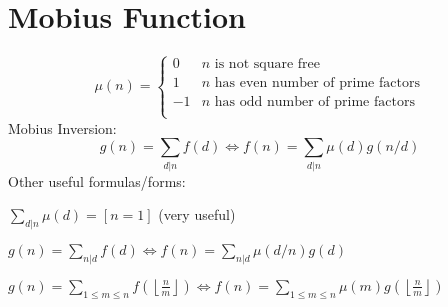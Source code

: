 \section{Mobius Function}
\[
   \mu(n) = \begin{cases} 0 & n \textrm{ is not square free}\\ 1 & n \textrm{ has even number of prime factors}\\ -1 & n \textrm{ has odd number of prime factors}\\\end{cases}
\]
Mobius Inversion:
\[ g(n) = \sum_{d|n} f(d) \Leftrightarrow f(n) = \sum_{d|n} \mu(d)g(n/d) \]
Other useful formulas/forms:

$ \sum_{d | n} \mu(d) = [ n = 1] $ (very useful)

$ g(n) = \sum_{n|d} f(d) \Leftrightarrow f(n) = \sum_{n|d} \mu(d/n)g(d)$

$ g(n) = \sum_{1 \leq m \leq n} f(\left\lfloor\frac{n}{m}\right \rfloor ) \Leftrightarrow f(n) = \sum_{1\leq m\leq n} \mu(m)g(\left\lfloor\frac{n}{m}\right\rfloor)$
